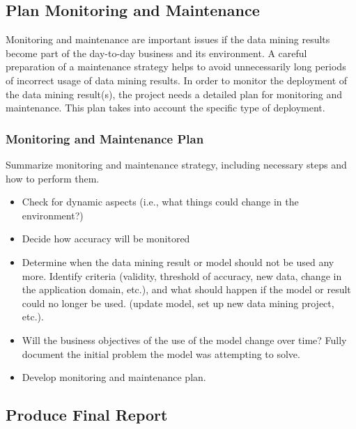 \documentclass[
]{article}
\providecommand{\tightlist}{%
  \setlength{\itemsep}{0pt}\setlength{\parskip}{0pt}}
\begin{document}
\hypertarget{plan-monitoring-and-maintenance}{%
\subsection{Plan Monitoring and
Maintenance}\label{plan-monitoring-and-maintenance}}

Monitoring and maintenance are important issues if the data mining
results become part of the day-to-day business and its environment. A
careful preparation of a maintenance strategy helps to avoid
unnecessarily long periods of incorrect usage of data mining results. In
order to monitor the deployment of the data mining result(s), the
project needs a detailed plan for monitoring and maintenance. This plan
takes into account the specific type of deployment.

\hypertarget{monitoring-and-maintenance-plan}{%
\subsubsection{Monitoring and Maintenance
Plan}\label{monitoring-and-maintenance-plan}}

Summarize monitoring and maintenance strategy, including necessary steps
and how to perform them.

\begin{itemize}
\tightlist
\item
  Check for dynamic aspects (i.e., what things could change in the
  environment?)
\item
  Decide how accuracy will be monitored
\item
  Determine when the data mining result or model should not be used any
  more. Identify criteria (validity, threshold of accuracy, new data,
  change in the application domain, etc.), and what should happen if the
  model or result could no longer be used. (update model, set up new
  data mining project, etc.).
\item
  Will the business objectives of the use of the model change over time?
  Fully document the initial problem the model was attempting to solve.
\item
  Develop monitoring and maintenance plan.
\end{itemize}

\hypertarget{produce-final-report}{%
\subsection{Produce Final Report}\label{produce-final-report}}
\end{document}
